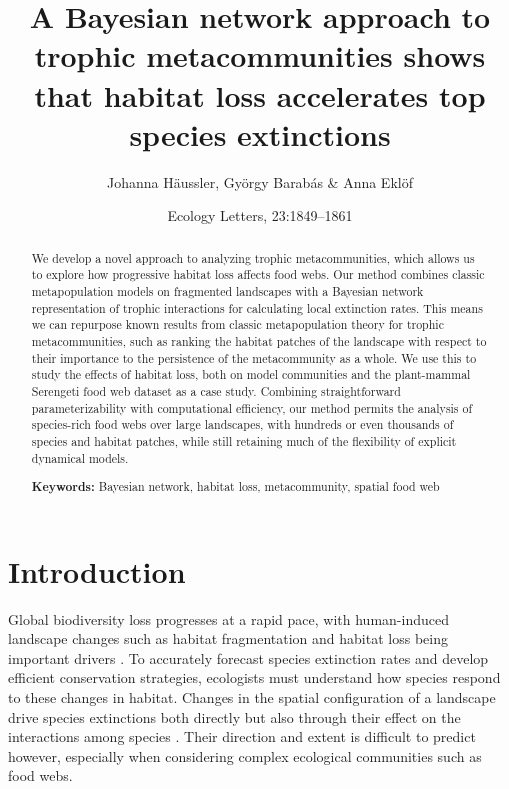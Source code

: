 \documentclass[11pt]{article}
\begin{document}
\title{A Bayesian network approach to trophic metacommunities shows that habitat loss accelerates top species extinctions}
\author{Johanna H\"aussler, Gy\"orgy Barab\'as \& Anna Ekl\"of}
\date{Ecology Letters, 23:1849–1861}

\maketitle


\begin{abstract}
  \noindent \normalsize We develop a novel approach to analyzing trophic metacommunities, which allows us to explore how progressive habitat loss affects food webs. Our method combines classic metapopulation models on fragmented landscapes with a Bayesian network representation of trophic interactions for calculating local extinction rates. This means we can repurpose known results from classic metapopulation theory for trophic metacommunities, such as ranking the habitat patches of the landscape with respect to their importance to the persistence of the metacommunity as a whole. We use this to study the effects of habitat loss, both on model communities and the plant-mammal Serengeti food web dataset as a case study. Combining straightforward parameterizability with computational efficiency, our method permits the analysis of species-rich food webs over large landscapes, with hundreds or even thousands of species and habitat patches, while still retaining much of the flexibility of explicit dynamical models.

  \bigskip

  \noindent\textbf{Keywords:} Bayesian network, habitat loss, metacommunity, spatial food web
\end{abstract}


\section{Introduction} \label{sec:intro}

Global biodiversity loss progresses at a rapid pace, with human-induced landscape changes such as habitat fragmentation and habitat loss being important drivers \citep{Tylianakis2008, Haddad2015}. To accurately forecast species extinction rates and develop efficient conservation strategies, ecologists must understand how species respond to these changes in habitat. Changes in the spatial configuration of a landscape drive species extinctions both directly but also through their effect on the interactions among species \citep{Tylianakis2008, Valiente-Banuet2015}. Their direction and extent is difficult to predict however, especially when considering complex ecological communities such as food webs.
\end{document}
